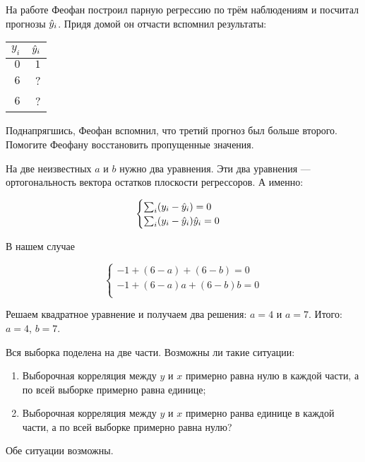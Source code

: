 \begin{problem} %
На работе Феофан построил парную регрессию по трём наблюдениям и посчитал прогнозы $\hat{y}_i$. Придя домой он отчасти вспомнил результаты:

\begin{tabular}{rr}
\toprule
$y_i$ & $\hat{y}_i$ \\
\midrule
$0$ & $1$ \\
$6$ & ? \\
$6$ & ? \\
\bottomrule
\end{tabular}

Поднапрягшись, Феофан вспомнил, что третий прогноз был больше второго. Помогите Феофану восстановить пропущенные значения.


\begin{sol}
На две неизвестных $a$ и $b$ нужно два уравнения. Эти два уравнения — ортогональность вектора остатков плоскости регрессоров. А именно:

\[
\begin{cases}
\sum_i (y_i - \hat{y}_i) = 0 \\
\sum_i (y_i - \hat{y}_i) \hat{y}_i = 0 \\
\end{cases}
\]

В нашем случае

\[
\begin{cases}
-1 +(6-a) + (6-b) = 0 \\
-1 + (6 - a)a + (6-b)b = 0 \\
\end{cases}
\]

Решаем квадратное уравнение и получаем два решения: $a=4$ и $a=7$. Итого: $a=4$, $b=7$.
\end{sol}
\end{problem}


\begin{problem}
Вся выборка поделена на две части. Возможны ли такие ситуации:
\begin{enumerate}
\item Выборочная корреляция между $y$ и $x$ примерно равна нулю в каждой части, а по всей выборке примерно равна единице;
\item Выборочная корреляция между $y$ и $x$ примерно ранва единице в каждой части, а по всей выборке примерно равна нулю?
\end{enumerate}

\begin{sol}
Обе ситуации возможны.
\end{sol}
\end{problem}


